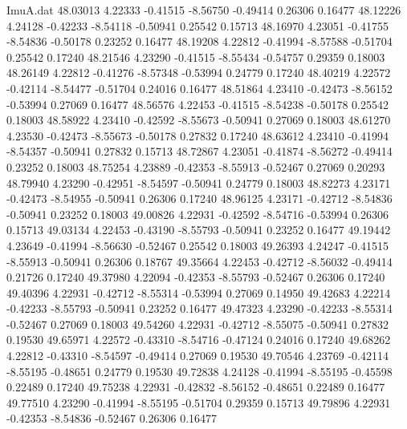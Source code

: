 \begin{filecontents}{ImuA.dat}
  48.03013    4.22333   -0.41515   -8.56750   -0.49414    0.26306    0.16477
  48.12226    4.24128   -0.42233   -8.54118   -0.50941    0.25542    0.15713
  48.16970    4.23051   -0.41755   -8.54836   -0.50178    0.23252    0.16477
  48.19208    4.22812   -0.41994   -8.57588   -0.51704    0.25542    0.17240
  48.21546    4.23290   -0.41515   -8.55434   -0.54757    0.29359    0.18003
  48.26149    4.22812   -0.41276   -8.57348   -0.53994    0.24779    0.17240
  48.40219    4.22572   -0.42114   -8.54477   -0.51704    0.24016    0.16477
  48.51864    4.23410   -0.42473   -8.56152   -0.53994    0.27069    0.16477
  48.56576    4.22453   -0.41515   -8.54238   -0.50178    0.25542    0.18003
  48.58922    4.23410   -0.42592   -8.55673   -0.50941    0.27069    0.18003
  48.61270    4.23530   -0.42473   -8.55673   -0.50178    0.27832    0.17240
  48.63612    4.23410   -0.41994   -8.54357   -0.50941    0.27832    0.15713
  48.72867    4.23051   -0.41874   -8.56272   -0.49414    0.23252    0.18003
  48.75254    4.23889   -0.42353   -8.55913   -0.52467    0.27069    0.20293
  48.79940    4.23290   -0.42951   -8.54597   -0.50941    0.24779    0.18003
  48.82273    4.23171   -0.42473   -8.54955   -0.50941    0.26306    0.17240
  48.96125    4.23171   -0.42712   -8.54836   -0.50941    0.23252    0.18003
  49.00826    4.22931   -0.42592   -8.54716   -0.53994    0.26306    0.15713
  49.03134    4.22453   -0.43190   -8.55793   -0.50941    0.23252    0.16477
  49.19442    4.23649   -0.41994   -8.56630   -0.52467    0.25542    0.18003
  49.26393    4.24247   -0.41515   -8.55913   -0.50941    0.26306    0.18767
  49.35664    4.22453   -0.42712   -8.56032   -0.49414    0.21726    0.17240
  49.37980    4.22094   -0.42353   -8.55793   -0.52467    0.26306    0.17240
  49.40396    4.22931   -0.42712   -8.55314   -0.53994    0.27069    0.14950
  49.42683    4.22214   -0.42233   -8.55793   -0.50941    0.23252    0.16477
  49.47323    4.23290   -0.42233   -8.55314   -0.52467    0.27069    0.18003
  49.54260    4.22931   -0.42712   -8.55075   -0.50941    0.27832    0.19530
  49.65971    4.22572   -0.43310   -8.54716   -0.47124    0.24016    0.17240
  49.68262    4.22812   -0.43310   -8.54597   -0.49414    0.27069    0.19530
  49.70546    4.23769   -0.42114   -8.55195   -0.48651    0.24779    0.19530
  49.72838    4.24128   -0.41994   -8.55195   -0.45598    0.22489    0.17240
  49.75238    4.22931   -0.42832   -8.56152   -0.48651    0.22489    0.16477
  49.77510    4.23290   -0.41994   -8.55195   -0.51704    0.29359    0.15713
  49.79896    4.22931   -0.42353   -8.54836   -0.52467    0.26306    0.16477

\end{filecontents}
